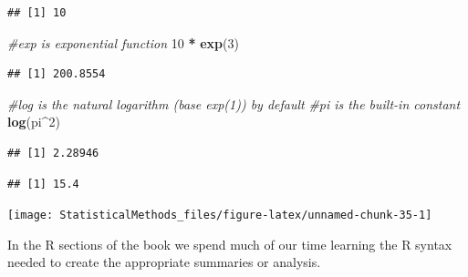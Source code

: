 \documentclass[
]{book}
\newenvironment{Shaded}{\begin{snugshade}}{\end{snugshade}}
\newcommand{\CommentTok}[1]{\textcolor[rgb]{0.56,0.35,0.01}{\textit{#1}}}
\newcommand{\DecValTok}[1]{\textcolor[rgb]{0.00,0.00,0.81}{#1}}
\newcommand{\KeywordTok}[1]{\textcolor[rgb]{0.13,0.29,0.53}{\textbf{#1}}}
\newcommand{\NormalTok}[1]{#1}
\newcommand{\OperatorTok}[1]{\textcolor[rgb]{0.81,0.36,0.00}{\textbf{#1}}}
\newcommand{\StringTok}[1]{\textcolor[rgb]{0.31,0.60,0.02}{#1}}
\theoremstyle{definition}
\theoremstyle{definition}
\theoremstyle{definition}
\theoremstyle{remark}
\begin{document}
\begin{verbatim}
## [1] 10
\end{verbatim}

\begin{Shaded}
\begin{Highlighting}[]
\CommentTok{#exp is exponential function}
\DecValTok{10} \OperatorTok{*}\StringTok{ }\KeywordTok{exp}\NormalTok{(}\DecValTok{3}\NormalTok{)}
\end{Highlighting}
\end{Shaded}

\begin{verbatim}
## [1] 200.8554
\end{verbatim}

\begin{Shaded}
\begin{Highlighting}[]
\CommentTok{#log is the natural logarithm (base exp(1)) by default}
\CommentTok{#pi is the built-in constant}
\KeywordTok{log}\NormalTok{(pi}\OperatorTok{^}\DecValTok{2}\NormalTok{) }
\end{Highlighting}
\end{Shaded}

\begin{verbatim}
## [1] 2.28946
\end{verbatim}

\begin{Shaded}
\end{Shaded}

\begin{verbatim}
## [1] 15.4
\end{verbatim}

\begin{Shaded}
\end{Shaded}

\begin{center}\texttt{[image: StatisticalMethods\_files/figure-latex/unnamed-chunk-35-1]} \end{center}

In the R sections of the book we spend much of our time learning the R syntax needed to create the appropriate summaries or analysis.
\end{document}
